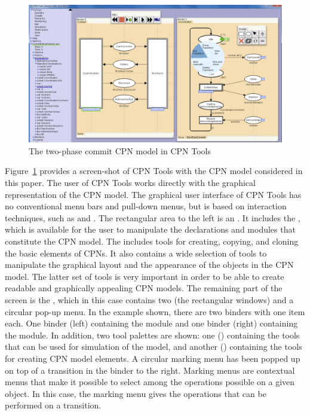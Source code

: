 \begin{figure}[t]
\centering
\includegraphics[scale=.37]{figures/cpntools.png}
\caption{The two-phase commit CPN model in CPN Tools}
\label{fig:cpntools}
\end{figure}

Figure~\ref{fig:cpntools} provides a screen-shot of CPN Tools with the
CPN model considered in this paper. The user of CPN Tools works
directly with the graphical representation of the CPN model. The
graphical user interface of CPN Tools has no conventional menu bars
and pull-down menus, but is based on interaction techniques, such as
 and . The rectangular
area to the left is an . It includes the , which is available for the user to manipulate the declarations
and modules that constitute the CPN model. The 
includes tools for creating, copying, and cloning the basic elements
of CPNs. It also contains a wide selection of tools to manipulate the
graphical layout and the appearance of the objects in the CPN
model. The latter set of tools is very important in order to be able
to create readable and graphically appealing CPN models. The remaining
part of the screen is the , which in this case
contains two  (the rectangular windows) and a
circular pop-up menu. In the example shown, there are two
binders with one item each. One binder (left) containing the
 module and one binder (right) containing the
 module. In addition, two tool palettes are
shown: one () containing the tools that can be used for
simulation of the model, and another () containing the
tools for creating CPN model elements. A
circular marking menu has been popped up on top of a transition in the
binder to the right. Marking menus are contextual menus that make it
possible to select among the operations possible on a given object. In
this case, the marking menu gives the operations that can be performed
on a transition.




